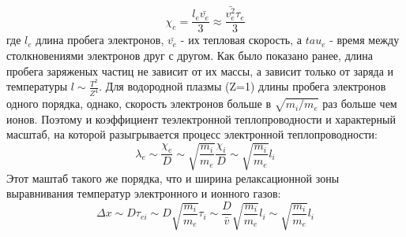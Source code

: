 \documentclass[10pt, a4paper]{article}
\numberwithin{equation}{section}
\begin{document}
\begin{equation}
	\chi_e=\frac{l_e \bar{v_e}}{3} \approx \frac{\bar{v_e^{2}} \tau_e}{3}
\end{equation} 
где $l_e$ длина пробега электронов, $\bar{v_e}$ - их тепловая скорость, а $tau_e$ - время между столкновениями электронов друг с другом.
Как было показано ранее, длина пробега заряженых частиц не зависит от их массы, а зависит только от заряда и температуры $l \sim \frac{T^{2}}{Z^{4}}$. Для водородной плазмы (Z=1) длины пробега электронов одного порядка, однако, скорость электронов больше в $\sqrt{m_i / m_e}$ раз больше чем ионов. Поэтому и коэффициент теэлектронной теплопроводности и характерный масштаб, на которой разыгрывается процесс электронной теплопроводности:
\begin{equation}
	\lambda_e \sim \frac{\chi_e}{D} \sim \sqrt{\frac{m_i}{m_e}} \frac{\chi_i}{D} \sim \sqrt{\frac{m_i}{m_e}} l_i
\end{equation}
Этот маштаб такого же порядка, что и ширина релаксационной зоны выравнивания температур электронного и ионного газов:
\begin{equation}
	\Delta x \sim D \tau_{ei} \sim D \sqrt{\frac{m_i}{m_e}} \tau_i \sim \frac{D}{\bar{v}} \sqrt{\frac{m_i}{m_e}} l_i \sim \sqrt{\frac{m_i}{m_e}} l_i
\end{equation}
\end{document}
